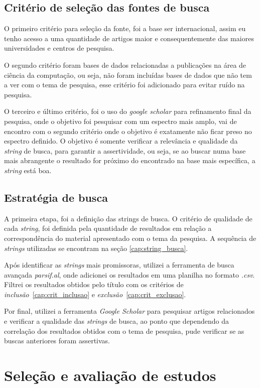 \documentclass{article}
\begin{document}
\subsection{Critério de seleção das fontes de busca}
O primeiro critério para seleção da fonte, foi a base ser internacional, assim eu tenho acesso a uma quantidade de artigos maior e consequentemente das maiores universidades e centros de pesquisa.

O segundo critério foram bases de dados relacionadas a publicações na área de ciência da computação, ou seja, não foram incluídas bases de dados que não tem a ver com o tema de pesquisa, esse critério foi adicionado para evitar ruído na pesquisa.

O terceiro e último critério, foi o uso do \emph{google scholar} para refinamento final da pesquisa, onde o objetivo foi pesquisar com um espectro mais amplo, vai de encontro com o segundo critério onde o objetivo é exatamente não ficar preso no espectro definido. O objetivo é somente verificar a relevância e qualidade da \emph{string} de busca, para garantir a assertividade, ou seja, se ao buscar numa base mais abrangente o resultado for próximo do encontrado na base mais específica, a \emph{string} está boa.

\subsection{Estratégia de busca}
A primeira etapa, foi a definição das strings de busca. O critério de qualidade de cada \emph{string}, foi definida pela quantidade de resultados em relação a correspondência do material apresentado com o tema da pesquisa. A sequência de \emph{strings} utilizadas se encontram na seção \ref{cap:string_busca}.

Após identificar as \emph{strings} mais promissoras, utilizei a ferramenta de busca avançada \emph{parsif.al}, onde adicionei os resultados em uma planilha no formato \emph{.csv}. Filtrei os resultados obtidos pelo título com os critérios de \emph{inclusão}~\ref{cap:crit_inclusao} e \emph{exclusão}~\ref{cap:crit_exclusao}. 

Por final, utilizei a ferramenta \emph{Google Scholar} para pesquisar artigos relacionados e verificar a qualidade das \emph{strings} de busca, ao ponto que dependendo da correlação dos resultados obtidos com o tema de pesquisa, pude verificar se as buscas anteriores foram assertivas.

\section{Seleção e avaliação de estudos}
\end{document}
